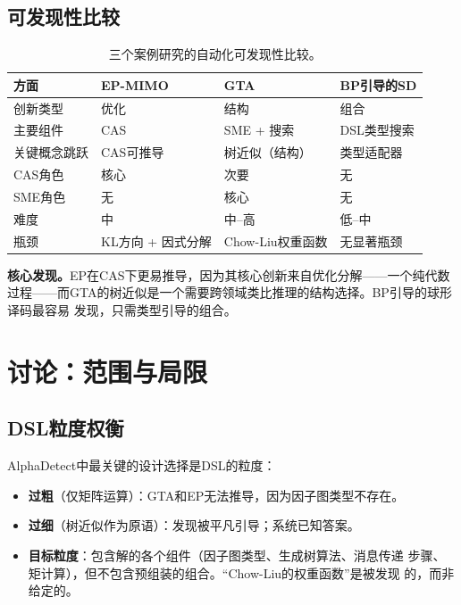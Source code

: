 \documentclass[12pt,a4paper]{article}
\begin{document}
\subsection{可发现性比较}

\begin{table}[H]
  \centering
  \caption{三个案例研究的自动化可发现性比较。}
  \label{tab:discoverability}
  \small
  \begin{tabular}{@{}p{3.0cm}p{3.0cm}p{3.0cm}p{3.5cm}@{}}
    \toprule
    \textbf{方面} & \textbf{EP-MIMO} & \textbf{GTA} & \textbf{BP引导的SD} \\
    \midrule
    创新类型 & 优化 & 结构 & 组合 \\
    主要组件 & CAS & SME + 搜索 & DSL类型搜索 \\
    关键概念跳跃 & CAS可推导 & 树近似（结构） & 类型适配器 \\
    CAS角色 & 核心 & 次要 & 无 \\
    SME角色 & 无 & 核心 & 无 \\
    难度 & 中 & 中--高 & 低--中 \\
    瓶颈 & KL方向 + 因式分解 & Chow-Liu权重函数 & 无显著瓶颈 \\
    \bottomrule
  \end{tabular}
\end{table}

\noindent
\textbf{核心发现。}EP在CAS下更易推导，因为其核心创新来自优化分解——一个纯代数
过程——而GTA的树近似是一个需要跨领域类比推理的结构选择。BP引导的球形译码最容易
发现，只需类型引导的组合。

\section{讨论：范围与局限}
\label{sec:discussion}

\subsection{DSL粒度权衡}

AlphaDetect中最关键的设计选择是DSL的粒度：

\begin{itemize}[itemsep=2pt]
  \item \textbf{过粗}（仅矩阵运算）：GTA和EP无法推导，因为因子图类型不存在。
  \item \textbf{过细}（树近似作为原语）：发现被平凡引导；系统已知答案。
  \item \textbf{目标粒度}：包含解的各个组件（因子图类型、生成树算法、消息传递
        步骤、矩计算），但不包含预组装的组合。``Chow-Liu的权重函数''是被发现
        的，而非给定的。
\end{itemize}
\end{document}
